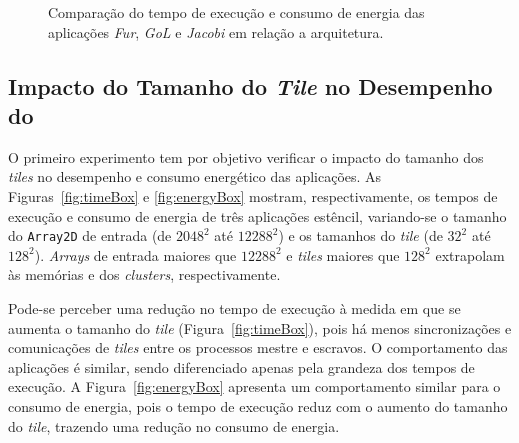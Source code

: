 \begin{figure}[t]
    \centering
    \qquad
    \caption{Comparação do tempo de execução e consumo de energia das aplicações \textit{Fur}, \textit{GoL} e \textit{Jacobi} em relação a arquitetura.}
    \label{fig:comparison-time}
\end{figure}

\subsection{Impacto do Tamanho do \textit{Tile} no Desempenho do \mppa}

O primeiro experimento tem por objetivo verificar o impacto do tamanho dos
\textit{tiles} no desempenho e consumo energético das aplicações. As
Figuras~\ref{fig:timeBox} e \ref{fig:energyBox} mostram, respectivamente, os
tempos de execução e consumo de energia de três aplicações estêncil, variando-se
o tamanho do \texttt{Array2D} de entrada (de $2048^2$ até $12288^2$) e os
tamanhos do \textit{tile} (de $32^2$ até $128^2$). \textit{Arrays} de entrada
maiores que $12288^2$ e \textit{tiles} maiores que $128^2$ extrapolam às
memórias \lpddr e dos \textit{clusters}, respectivamente.

Pode-se perceber uma redução no tempo de execução à medida em que se aumenta o
tamanho do \textit{tile} (Figura~\ref{fig:timeBox}), pois há menos
sincronizações e comunicações de \textit{tiles} entre os processos mestre e
escravos. O comportamento das aplicações é similar, sendo diferenciado apenas
pela grandeza dos tempos de execução.
A Figura~\ref{fig:energyBox} apresenta um comportamento similar para o consumo
de energia, pois o tempo de execução reduz com o aumento do tamanho do
\textit{tile}, trazendo uma redução no consumo de energia.

